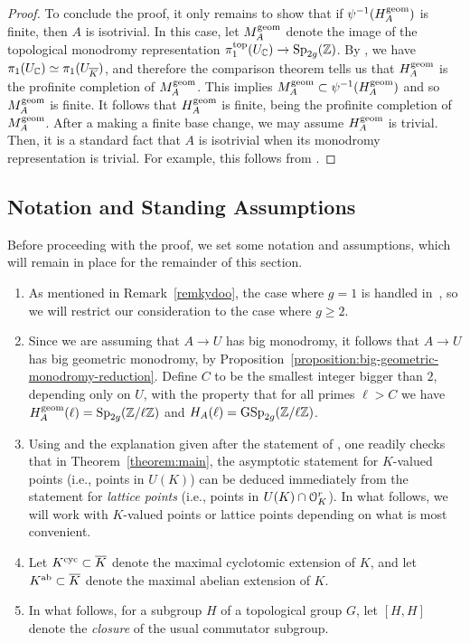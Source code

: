 \begin{proof}
	To conclude the proof, it only remains to show that if $\psi^{-1}(H_A^{\operatorname{geom}})$ is finite, then $A$ is isotrivial.
	In this case, let $M_A^{\operatorname{geom}}$ denote the image of the topological monodromy
	representation $\pi_1^{\operatorname{top}}(U_{{\mathbb C}}) \rightarrow \operatorname{Sp}_{2g}({\mathbb Z})$.
	By \cite[Expos\'e XIII, Proposition 4.6]{SGA1Grothendieck1971}, we have 
	$\pi_1(U_{{\mathbb C}}) \simeq \pi_1(U_{\overline K})$, and therefore the comparison theorem tells us that $H_A^{\operatorname{geom}}$
	is the profinite completion of $M_A^{\operatorname{geom}}$.
	This implies $M_A^{\operatorname{geom}} \subset \psi^{-1}(H_A^{\operatorname{geom}})$
	and so $M_A^{\operatorname{geom}}$ is finite. It follows that $H_A^{\operatorname{geom}}$ is finite, being the profinite completion
	of $M_A^{\operatorname{geom}}$.
	After a making a finite base change, we may assume
	$H_A^{\operatorname{geom}}$ is trivial.
	Then, it is a standard fact that $A$ is isotrivial when its monodromy
	representation is trivial. For example, this follows from
	\cite{grothendieck:un-theoreme-sur-les-homomorphismes}.
\end{proof}



\subsection{Notation and Standing Assumptions}\label{toomanynotes}

Before proceeding with the proof, we set some notation and assumptions, which will remain in place for the remainder of this section.
\begin{enumerate}
\item As mentioned in Remark~\ref{remkydoo}, the case where $g=1$ is handled in~\cite[Theorem 7.1]{zywina2010hilbert}, so we will restrict our consideration to the case where $g \geq 2$.
\item 	
    Since we are assuming that $A \to U$ has big monodromy, it follows that $A \to U$ has big geometric monodromy, by Proposition~\ref{proposition:big-geometric-monodromy-reduction}. Define $C$ to be the smallest
integer bigger than $2$, depending only on $U$, with the property that for all primes $\ell > C$ we have $H_A^{\operatorname{geom}}(\ell) = \operatorname{Sp}_{2g}(\mathbb Z/\ell \mathbb Z)$ and $H_A(\ell) = \operatorname{GSp}_{2g}(\mathbb Z/\ell \mathbb Z)$.
\item Using \cite[Proposition 6.1]{zywina2010hilbert} and the explanation
	given after the statement of
	\cite[Theorem 7.1]{zywina2010hilbert}, one readily checks that in Theorem~\ref{theorem:main}, the asymptotic statement for $K$-valued points (i.e., points in $U(K)$) can be deduced immediately from the statement for \emph{lattice points} (i.e., points in $U(K) \cap \mathcal O_K^r$). In what follows, we will work with $K$-valued points or lattice points depending on what is most convenient.
\item Let $K^{\operatorname{cyc}} \subset \overline{K}$ denote the maximal cyclotomic extension of $K$, and let $K^{\text{ab}} \subset \overline{K}$ denote the maximal abelian extension of $K$.
\item In what follows, for a subgroup $H$ of a topological group $G$, let $[H,H]$ denote the \emph{closure} of the usual commutator subgroup.
\end{enumerate}

